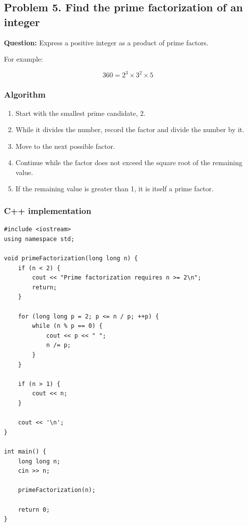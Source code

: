 \subsection{Problem 5. Find the prime factorization of an integer}

\textbf{Question:} Express a positive integer as a product of prime factors.

For example:


\[
360=2^3\times3^2\times5
\]


\subsubsection{Algorithm}

\begin{enumerate}
    \item Start with the smallest prime candidate, 2.
    \item While it divides the number, record the factor and divide the number by it.
    \item Move to the next possible factor.
    \item Continue while the factor does not exceed the square root of the remaining value.
    \item If the remaining value is greater than 1, it is itself a prime factor.
\end{enumerate}

\subsubsection{C++ implementation}

\begin{lstlisting}[style=cppstyle]
#include <iostream>
using namespace std;

void primeFactorization(long long n) {
    if (n < 2) {
        cout << "Prime factorization requires n >= 2\n";
        return;
    }

    for (long long p = 2; p <= n / p; ++p) {
        while (n % p == 0) {
            cout << p << " ";
            n /= p;
        }
    }

    if (n > 1) {
        cout << n;
    }

    cout << '\n';
}

int main() {
    long long n;
    cin >> n;

    primeFactorization(n);

    return 0;
}
\end{lstlisting}

